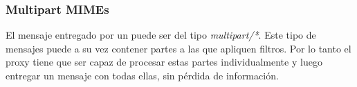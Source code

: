 \documentclass[11pt,a4paper,titlepage]{article}
\begin{document}
\subsubsection{Multipart MIMEs}
El mensaje entregado por un \os puede ser del tipo \textit{multipart/*}.
Este tipo de mensajes puede a su vez contener partes a las que apliquen filtros.
Por lo tanto el proxy tiene que ser capaz de procesar estas partes individualmente y luego entregar un mensaje con todas ellas, sin pérdida de información.

\end{document}

